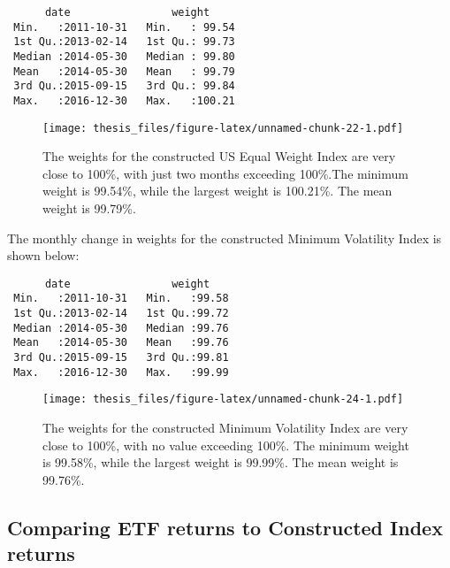 \documentclass[12pt,twoside]{reedthesis}
\theoremstyle{definition}
\theoremstyle{definition}
\theoremstyle{definition}
\theoremstyle{remark}
\begin{document}
\clearpage 
\begin{verbatim}
      date                weight      
 Min.   :2011-10-31   Min.   : 99.54  
 1st Qu.:2013-02-14   1st Qu.: 99.73  
 Median :2014-05-30   Median : 99.80  
 Mean   :2014-05-30   Mean   : 99.79  
 3rd Qu.:2015-09-15   3rd Qu.: 99.84  
 Max.   :2016-12-30   Max.   :100.21  
\end{verbatim}
\begin{figure}[htbp]
\centering
\texttt{[image: thesis\_files/figure-latex/unnamed-chunk-22-1.pdf]}
\caption{\label{fig:unnamed-chunk-22}The weights for the constructed US
Equal Weight Index are very close to 100\%, with just two months
exceeding 100\%.The minimum weight is 99.54\%, while the largest weight
is 100.21\%. The mean weight is 99.79\%.}
\end{figure}
\clearpage  The monthly change in weights for the constructed Minimum
Volatility Index is shown below:
\begin{verbatim}
      date                weight     
 Min.   :2011-10-31   Min.   :99.58  
 1st Qu.:2013-02-14   1st Qu.:99.72  
 Median :2014-05-30   Median :99.76  
 Mean   :2014-05-30   Mean   :99.76  
 3rd Qu.:2015-09-15   3rd Qu.:99.81  
 Max.   :2016-12-30   Max.   :99.99  
\end{verbatim}
\begin{figure}[htbp]
\centering
\texttt{[image: thesis\_files/figure-latex/unnamed-chunk-24-1.pdf]}
\caption{\label{fig:unnamed-chunk-24}The weights for the constructed Minimum
Volatility Index are very close to 100\%, with no value exceeding 100\%.
The minimum weight is 99.58\%, while the largest weight is 99.99\%. The
mean weight is 99.76\%.}
\end{figure}
\subsection{Comparing ETF returns to Constructed Index
returns}\label{comparing-etf-returns-to-constructed-index-returns}
\end{document}
